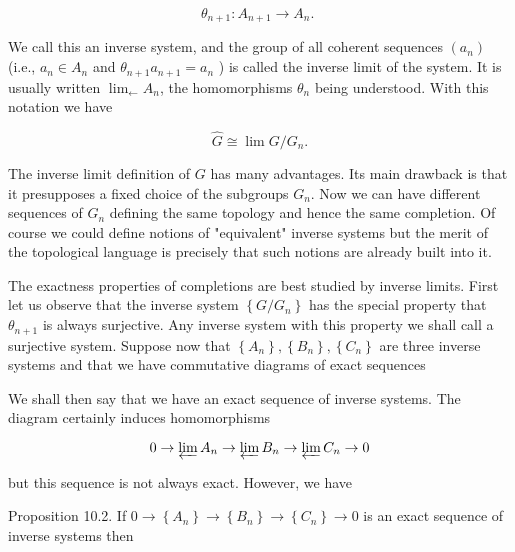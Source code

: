 \documentclass{standalone}
\theoremstyle{definition}
\theoremstyle{remark}
\begin{document}
\[
\theta_{n+1}: A_{n+1} \rightarrow A_{n} \text {. }
\]

We call this an inverse system, and the group of all coherent sequences $\left(a_{n}\right)$ (i.e., $a_{n} \in A_{n}$ and $\theta_{n+1} a_{n+1}=a_{n}$ ) is called the inverse limit of the system. It is usually written $\lim _{\leftarrow} A_{n}$, the homomorphisms $\theta_{n}$ being understood. With this notation we have

\[
\hat{G} \cong \lim G / G_{n} .
\]

The inverse limit definition of $G$ has many advantages. Its main drawback is that it presupposes a fixed choice of the subgroups $G_{n}$. Now we can have different sequences of $G_{n}$ defining the same topology and hence the same completion. Of course we could define notions of "equivalent" inverse systems but the merit of the topological language is precisely that such notions are already built into it.

The exactness properties of completions are best studied by inverse limits. First let us observe that the inverse system $\left\{G / G_{n}\right\}$ has the special property that $\theta_{n+1}$ is always surjective. Any inverse system with this property we shall call a surjective system. Suppose now that $\left\{A_{n}\right\},\left\{B_{n}\right\},\left\{C_{n}\right\}$ are three inverse systems and that we have commutative diagrams of exact sequences

\begin{center}
\end{center}

We shall then say that we have an exact sequence of inverse systems. The diagram certainly induces homomorphisms

\[
0 \rightarrow \varprojlim A_{n} \rightarrow \varprojlim B_{n} \rightarrow \varprojlim C_{n} \rightarrow 0
\]

but this sequence is not always exact. However, we have

Proposition 10.2. If $0 \rightarrow\left\{A_{n}\right\} \rightarrow\left\{B_{n}\right\} \rightarrow\left\{C_{n}\right\} \rightarrow 0$ is an exact sequence of inverse systems then
\end{document}
